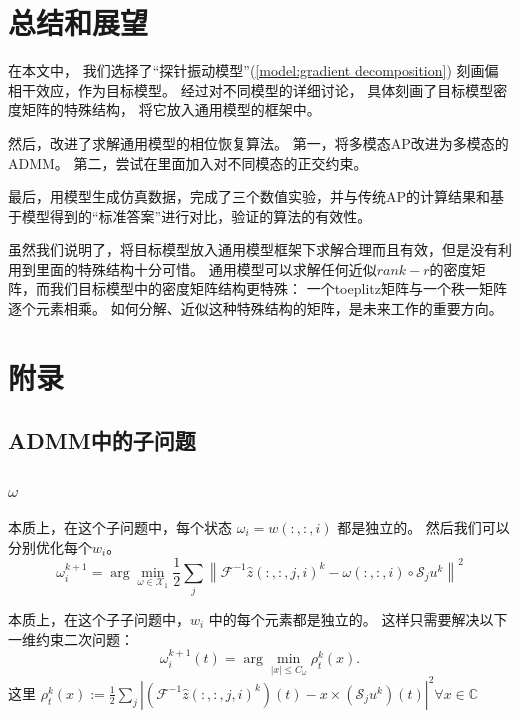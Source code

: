 \documentclass[12pt]{article}
\begin{document}
\section{总结和展望}

在本文中， 我们选择了“探针振动模型”(\ref{model:gradient decomposition}) 刻画偏相干效应，作为目标模型。 经过对不同模型的详细讨论， 具体刻画了目标模型密度矩阵的特殊结构， 将它放入通用模型的框架中。

然后，改进了求解通用模型的相位恢复算法。 第一，将多模态AP改进为多模态的ADMM。 第二，尝试在里面加入对不同模态的正交约束。

最后，用模型生成仿真数据，完成了三个数值实验，并与传统AP的计算结果和基于模型得到的“标准答案”进行对比，验证的算法的有效性。

虽然我们说明了，将目标模型放入通用模型框架下求解合理而且有效，但是没有利用到里面的特殊结构十分可惜。 通用模型可以求解任何近似$rank-r$的密度矩阵，而我们目标模型中的密度矩阵结构更特殊： 一个toeplitz矩阵与一个秩一矩阵逐个元素相乘。 如何分解、近似这种特殊结构的矩阵，是未来工作的重要方向。

\newpage 
\section{附录}
\subsection{ADMM中的子问题}
\label{section:subproblems}
\subsubsection{$\omega$}
本质上，在这个子问题中，每个状态 $\omega_i=w(:,:,i)$ 都是独立的。 然后我们可以分别优化每个$w_i$。
$$
\omega_i^{k+1}=\arg \min _{\omega \in \mathcal{X}_{1}} \frac{1}{2} \sum_{j}\left\|\mathcal{F}^{-1} \hat{z}(:,:,j,i)^{k}-\omega(:,:,i) \circ \mathcal{S}_{j} u^{k}\right\|^{2}
$$

本质上，在这个子子问题中，$w_i$ 中的每个元素都是独立的。
这样只需要解决以下一维约束二次问题：
$$
\omega_i^{k+1}(t)=\arg \min _{|x| \leq C_{\omega}} \rho_{t}^{k}(x).
$$
这里
$\rho_{t}^{k}(x):=\frac{1}{2} \sum_{j}\left|\left(\mathcal{F}^{-1} \hat{z}(:,:,j,i)^{k}\right)(t)-x \times\left(\mathcal{S}_{j} u^{k}\right)(t)\right|^{2} \forall x \in \mathbb{C}$ 
\end{document}
